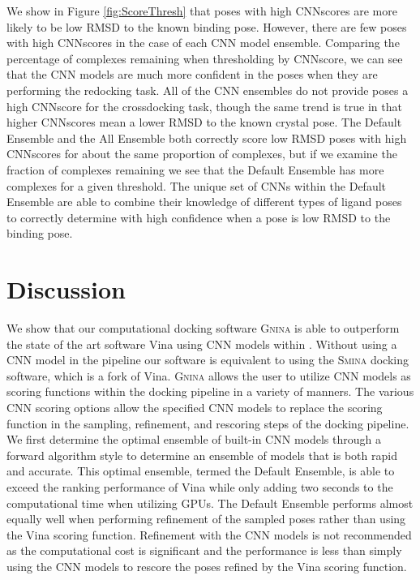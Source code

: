 \documentclass[journal=jcisd8,manuscript=article]{achemso}
\begin{document}
We show in Figure \ref{fig:ScoreThresh} that poses with high CNNscores are more likely to be low RMSD to the known binding pose. However, there are few poses with high CNNscores in the case of each CNN model ensemble. Comparing the percentage of complexes remaining when thresholding by CNNscore, we can see that the CNN models are much more confident in the poses when they are performing the redocking task. All of the CNN ensembles do not provide poses a high CNNscore for the crossdocking task, though the same trend is true in that higher CNNscores mean a lower RMSD to the known crystal pose. The Default Ensemble and the All Ensemble both correctly score low RMSD poses with high CNNscores for about the same proportion of complexes, but if we examine the fraction of complexes remaining we see that the Default Ensemble has more complexes for a given threshold. The unique set of CNNs within the Default Ensemble are able to combine their knowledge of different types of ligand poses to correctly determine with high confidence when a pose is low RMSD to the binding pose.

\section{Discussion}
We show that our computational docking software \textsc{Gnina} is able to outperform the state of the art software Vina using CNN models within . Without using a CNN model in the pipeline our software is equivalent to using the \textsc{Smina} docking software, which is a fork of Vina. \textsc{Gnina} allows the user to utilize CNN models as scoring functions within the docking pipeline in a variety of manners. The various CNN scoring options allow the specified CNN models to replace the scoring function in the sampling, refinement, and rescoring steps of the docking pipeline. We first determine the optimal ensemble of built-in CNN models through a forward algorithm style to determine an ensemble of models that is both rapid and accurate. This optimal ensemble, termed the Default Ensemble, is able to exceed the ranking performance of Vina while only adding two seconds to the computational time when utilizing GPUs. The Default Ensemble performs almost equally well when performing refinement of the sampled poses rather than using the Vina scoring function. Refinement with the CNN models is not recommended as the computational cost is significant and the performance is less than simply using the CNN models to rescore the poses refined by the Vina scoring function.
\end{document}

